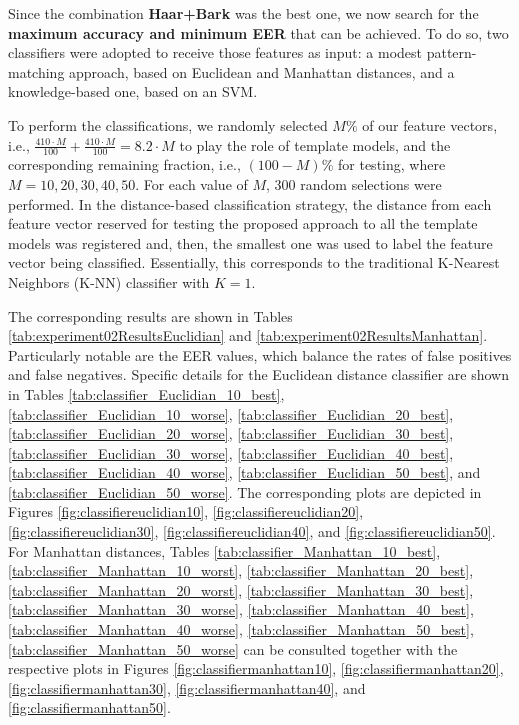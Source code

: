 	\par Since the combination \textbf{Haar+Bark} was the best one, we now search for the \textbf{maximum accuracy and minimum EER} that can be achieved. To do so, two classifiers were adopted to receive those features as input: a modest pattern-matching approach, based on Euclidean and Manhattan distances, and a knowledge-based one, based on an SVM. 
	\\
	\par To perform the classifications, we randomly selected $M\%$ of our feature vectors, i.e., $\frac{410 \cdot M}{100} + \frac{410 \cdot M}{100} = 8.2 \cdot M$ to play the role of template models, and the corresponding remaining fraction, i.e., $(100-M)\%$ for testing, where $M=10, 20, 30, 40, 50$. For each value of $M$, 300 random selections were performed. In the distance-based classification strategy, the distance from each feature vector reserved for testing the proposed approach to all the template models was registered and, then, the smallest one was used to label the feature vector being classified. Essentially, this corresponds to the traditional K-Nearest Neighbors (K-NN) classifier with $K=1$.     

		
		
		\FloatBarrier
		
		\par The corresponding results are shown in Tables \ref{tab:experiment02ResultsEuclidian} and \ref{tab:experiment02ResultsManhattan}. Particularly notable are the EER values, which balance the rates of false positives and false negatives. Specific details for the Euclidean distance classifier are shown in Tables \ref{tab:classifier_Euclidian_10_best}, \ref{tab:classifier_Euclidian_10_worse},
		\ref{tab:classifier_Euclidian_20_best}, \ref{tab:classifier_Euclidian_20_worse}, 
		\ref{tab:classifier_Euclidian_30_best}, \ref{tab:classifier_Euclidian_30_worse}, 
		\ref{tab:classifier_Euclidian_40_best}, \ref{tab:classifier_Euclidian_40_worse}, 
		\ref{tab:classifier_Euclidian_50_best},  and \ref{tab:classifier_Euclidian_50_worse}. The corresponding plots are depicted in Figures \ref{fig:classifiereuclidian10}, \ref{fig:classifiereuclidian20}, \ref{fig:classifiereuclidian30}, \ref{fig:classifiereuclidian40}, and \ref{fig:classifiereuclidian50}. For Manhattan distances,  Tables \ref{tab:classifier_Manhattan_10_best}, \ref{tab:classifier_Manhattan_10_worst}, 
		\ref{tab:classifier_Manhattan_20_best}, \ref{tab:classifier_Manhattan_20_worst}, 
		\ref{tab:classifier_Manhattan_30_best}, \ref{tab:classifier_Manhattan_30_worse}, 
		\ref{tab:classifier_Manhattan_40_best}, \ref{tab:classifier_Manhattan_40_worse}, 
		\ref{tab:classifier_Manhattan_50_best},
		\ref{tab:classifier_Manhattan_50_worse} 
		can be consulted together with the respective plots in Figures \ref{fig:classifiermanhattan10}, \ref{fig:classifiermanhattan20}, \ref{fig:classifiermanhattan30}, \ref{fig:classifiermanhattan40}, and \ref{fig:classifiermanhattan50}.

